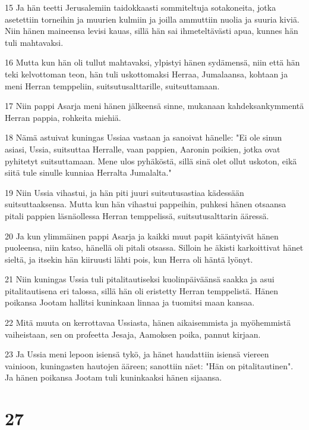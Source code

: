 \par 15 Ja hän teetti Jerusalemiin taidokkaasti sommiteltuja sotakoneita, jotka asetettiin torneihin ja muurien kulmiin ja joilla ammuttiin nuolia ja suuria kiviä. Niin hänen maineensa levisi kauas, sillä hän sai ihmeteltävästi apua, kunnes hän tuli mahtavaksi.
\par 16 Mutta kun hän oli tullut mahtavaksi, ylpistyi hänen sydämensä, niin että hän teki kelvottoman teon, hän tuli uskottomaksi Herraa, Jumalaansa, kohtaan ja meni Herran temppeliin, suitsutusalttarille, suitsuttamaan.
\par 17 Niin pappi Asarja meni hänen jälkeensä sinne, mukanaan kahdeksankymmentä Herran pappia, rohkeita miehiä.
\par 18 Nämä astuivat kuningas Ussiaa vastaan ja sanoivat hänelle: "Ei ole sinun asiasi, Ussia, suitsuttaa Herralle, vaan pappien, Aaronin poikien, jotka ovat pyhitetyt suitsuttamaan. Mene ulos pyhäköstä, sillä sinä olet ollut uskoton, eikä siitä tule sinulle kunniaa Herralta Jumalalta."
\par 19 Niin Ussia vihastui, ja hän piti juuri suitsutusastiaa kädessään suitsuttaaksensa. Mutta kun hän vihastui pappeihin, puhkesi hänen otsaansa pitali pappien läsnäollessa Herran temppelissä, suitsutusalttarin ääressä.
\par 20 Ja kun ylimmäinen pappi Asarja ja kaikki muut papit kääntyivät hänen puoleensa, niin katso, hänellä oli pitali otsassa. Silloin he äkisti karkoittivat hänet sieltä, ja itsekin hän kiiruusti lähti pois, kun Herra oli häntä lyönyt.
\par 21 Niin kuningas Ussia tuli pitalitautiseksi kuolinpäiväänsä saakka ja asui pitalitautisena eri talossa, sillä hän oli eristetty Herran temppelistä. Hänen poikansa Jootam hallitsi kuninkaan linnaa ja tuomitsi maan kansaa.
\par 22 Mitä muuta on kerrottavaa Ussiasta, hänen aikaisemmista ja myöhemmistä vaiheistaan, sen on profeetta Jesaja, Aamoksen poika, pannut kirjaan.
\par 23 Ja Ussia meni lepoon isiensä tykö, ja hänet haudattiin isiensä viereen vainioon, kuningasten hautojen ääreen; sanottiin näet: "Hän on pitalitautinen". Ja hänen poikansa Jootam tuli kuninkaaksi hänen sijaansa.

\chapter{27}

